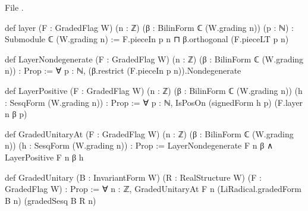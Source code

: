 \noindent File .
\begin{leancode}
def layer (F : GradedFlag W) (n : ℤ) (β : BilinForm ℂ (W.grading n)) (p : ℕ) :
    Submodule ℂ (W.grading n) :=
  F.pieceIn p n ⊓ β.orthogonal (F.pieceLT p n)

def LayerNondegenerate (F : GradedFlag W) (n : ℤ) (β : BilinForm ℂ (W.grading n)) : Prop :=
  ∀ p : ℕ, (β.restrict (F.pieceIn p n)).Nondegenerate

def LayerPositive (F : GradedFlag W) (n : ℤ) (β : BilinForm ℂ (W.grading n))
    (h : SesqForm (W.grading n)) : Prop :=
  ∀ p : ℕ, IsPosOn (signedForm h p) (F.layer n β p)

def GradedUnitaryAt (F : GradedFlag W) (n : ℤ) (β : BilinForm ℂ (W.grading n))
    (h : SesqForm (W.grading n)) : Prop :=
  LayerNondegenerate F n β ∧ LayerPositive F n β h

def GradedUnitary (B : InvariantForm W) (R : RealStructure W) (F : GradedFlag W) : Prop :=
  ∀ n : ℤ, GradedUnitaryAt F n (LiRadical.gradedForm B n) (gradedSesq B R n)
\end{leancode}

